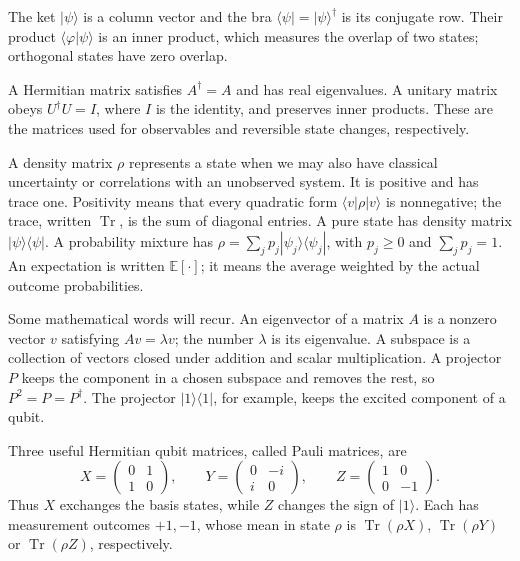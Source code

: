 \documentclass[11pt,a4paper]{article}
\numberwithin{equation}{section}
\theoremstyle{remark}
\DeclareMathOperator{\Tr}{Tr}
\newcommand{\E}{\mathbb E}
\begin{document}
The ket $|\psi\rangle$ is a column vector and the bra
$\langle\psi|=|\psi\rangle^\dagger$ is its conjugate row.
Their product $\langle\varphi|\psi\rangle$ is an inner product, which
measures the overlap of two states; orthogonal states have zero overlap.

A Hermitian matrix satisfies $A^\dagger=A$ and has real eigenvalues.
A unitary matrix obeys $U^\dagger U=I$, where $I$ is the identity,
and preserves inner products. These are the matrices used for observables and reversible
state changes, respectively.

A density matrix $\rho$ represents a state when we may also have classical
uncertainty or correlations with an unobserved system. It is positive and has
trace one. Positivity means that every quadratic form
$\langle v|\rho|v\rangle$ is nonnegative; the trace, written $\Tr$, is the sum
of diagonal entries. A pure state has density matrix
$|\psi\rangle\langle\psi|$. A probability mixture has
$\rho=\sum_j p_j|\psi_j\rangle\langle\psi_j|$, with $p_j\ge0$ and
$\sum_jp_j=1$. An expectation is written $\E[\cdot]$; it means the average
weighted by the actual outcome probabilities.

Some mathematical words will recur. An eigenvector of a matrix $A$ is
a nonzero vector $v$ satisfying $Av=\lambda v$; the number $\lambda$ is
its eigenvalue. A subspace is a collection of vectors closed under addition
and scalar multiplication. A projector $P$ keeps the component in a chosen
subspace and removes the rest, so $P^2=P=P^\dagger$. The projector
$|1\rangle\langle1|$, for example, keeps the excited component of a qubit.

Three useful Hermitian qubit matrices, called Pauli matrices, are
\begin{equation}
 X=\begin{pmatrix}0&1\\1&0\end{pmatrix},\qquad
 Y=\begin{pmatrix}0&-i\\i&0\end{pmatrix},\qquad
 Z=\begin{pmatrix}1&0\\0&-1\end{pmatrix}.
 \label{eq:pauli}
\end{equation}
Thus $X$ exchanges the basis states, while $Z$ changes the sign of
$|1\rangle$. Each has measurement outcomes $+1,-1$, whose mean in state
$\rho$ is $\Tr(\rho X)$, $\Tr(\rho Y)$ or $\Tr(\rho Z)$, respectively.
\end{document}
